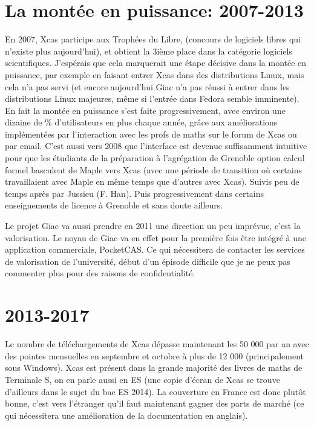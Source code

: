 \documentclass[a4paper,11pt]{book}
\begin{document}
\begin{giacjshere}
\section{La mont\'ee en puissance: 2007-2013}
En 2007, Xcas participe aux Troph\'ees du Libre, (concours
de logiciels libres qui n'existe plus aujourd'hui), et obtient
la 3i\`eme place dans la cat\'egorie logiciels scientifiques.
J'esp\'erais que cela marquerait une \'etape
d\'ecisive dans la mont\'ee en puissance,
par exemple en faisant entrer Xcas dans
des distributions Linux, mais cela n'a pas servi (et encore
aujourd'hui Giac n'a pas r\'eussi \`a entrer dans les distributions
Linux majeures, m\^eme si l'entr\'ee dans Fedora semble
imminente). En fait la mont\'ee en puissance s'est faite
progressivement, avec environ une dizaine de \% d'utilisateurs
en plus chaque ann\'ee, gr\^ace aux am\'eliorations
impl\'ement\'ees par l'interaction avec les profs
de maths sur le forum de Xcas ou par email. C'est aussi
vers 2008 que l'interface est devenue suffisamment
intuitive pour que les \'etudiants de la pr\'eparation
\`a l'agr\'egation de Grenoble option calcul formel
basculent de Maple vers Xcas
(avec une p\'eriode de transition o\`u certains travaillaient
avec Maple en m\^eme temps que d'autres avec Xcas). Suivis
peu de temps apr\`es par Jussieu (F. Han). Puis progressivement
dans certains enseignements de licence \`a Grenoble et
sans doute ailleurs.

Le projet Giac va aussi prendre en 2011 une direction un peu
impr\'evue, c'est la valorisation. Le noyau de Giac va
en effet pour la premi\`ere fois \^etre int\'egr\'e
\`a une application commerciale, PocketCAS. Ce qui n\'ecessitera
de contacter les services de valorisation de l'universit\'e, 
d\'ebut d'un \'episode
difficile que je ne peux pas commenter plus pour des
raisons de confidentialit\'e.

\section{2013-2017}
Le nombre de t\'el\'echargements de Xcas d\'epasse maintenant
les 50 000 par an avec des pointes mensuelles en septembre et octobre
\`a plus de 12 000 (principalement sous Windows). Xcas est
pr\'esent dans la grande majorit\'e des livres de maths de Terminale
S, on en parle aussi en ES (une copie d'\'ecran de Xcas se trouve
d'ailleurs dans le sujet du bac ES 2014).
La couverture en France est donc plut\^ot bonne, c'est
vers l'\'etranger qu'il faut maintenant gagner des parts de march\'e
(ce qui n\'ecessitera une am\'elioration de la documentation
en anglais).


\end{giacjshere}
\end{document}
